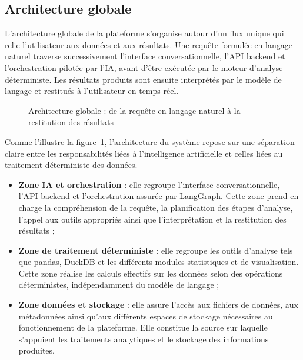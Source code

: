 \subsection{Architecture globale}

L'architecture globale de la plateforme s'organise autour d'un flux unique qui relie l'utilisateur aux données et aux résultats. Une requête formulée en langage naturel traverse successivement l'interface conversationnelle, l'API backend et l'orchestration pilotée par l'IA, avant d'être exécutée par le moteur d'analyse déterministe. Les résultats produits sont ensuite interprétés par le modèle de langage et restitués à l'utilisateur en temps réel.

\begin{figure}[H]
\centering
{}
\caption{Architecture globale : de la requête en langage naturel à la restitution des résultats}
\label{fig:arch-globale}
\end{figure}
Comme l'illustre la figure~\ref{fig:arch-globale}, l'architecture du
système repose sur une séparation claire entre les responsabilités
liées à l'intelligence artificielle et celles liées au traitement
déterministe des données.

\begin{itemize}
  \item \textbf{Zone IA et orchestration} : elle regroupe l'interface
  conversationnelle, l'API backend et l'orchestration assurée par
  LangGraph. Cette zone prend en charge la compréhension de la requête,
  la planification des étapes d'analyse, l'appel aux outils appropriés
  ainsi que l'interprétation et la restitution des résultats ;

  \item \textbf{Zone de traitement déterministe} : elle regroupe les
  outils d'analyse tels que pandas, DuckDB et les différents modules
  statistiques et de visualisation. Cette zone réalise les calculs
  effectifs sur les données selon des opérations déterministes,
  indépendamment du modèle de langage ;

  \item \textbf{Zone données et stockage} : elle assure l'accès aux
  fichiers de données, aux métadonnées ainsi qu'aux différents espaces
  de stockage nécessaires au fonctionnement de la plateforme. Elle
  constitue la source sur laquelle s'appuient les traitements
  analytiques et le stockage des informations produites.
\end{itemize}

